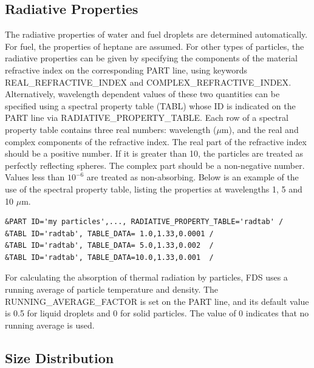 \documentclass[11pt]{book}
\begin{document}
\subsection{Radiative Properties}
\label{radiative_part_props}

The radiative properties of water and fuel droplets are determined automatically. For fuel, the properties of heptane are assumed. For other types of particles, the radiative properties can be given by specifying the components of the material refractive index on the corresponding {\ct PART} line, using keywords {\ct REAL\_REFRACTIVE\_INDEX} and {\ct COMPLEX\_REFRACTIVE\_INDEX}. Alternatively, wavelength dependent values of these two quantities can be specified using a spectral property table ({\ct TABL}) whose {\ct ID} is indicated on the {\ct PART} line via {\ct RADIATIVE\_PROPERTY\_TABLE}. Each row of a spectral property table contains three real numbers: wavelength ($\mu$m), and the real and complex components of the refractive index. The real part of the refractive index should be a positive number. If it is greater than 10, the particles are treated as perfectly reflecting spheres. The complex part should be a non-negative number. Values less than $10^{-6}$ are treated as non-absorbing. Below is an example of the use of the spectral property table, listing the properties at wavelengths 1, 5 and 10 $\mu$m.
\begin{lstlisting}
&PART ID='my particles',..., RADIATIVE_PROPERTY_TABLE='radtab' /
&TABL ID='radtab', TABLE_DATA= 1.0,1.33,0.0001 /
&TABL ID='radtab', TABLE_DATA= 5.0,1.33,0.002  /
&TABL ID='radtab', TABLE_DATA=10.0,1.33,0.001  /
\end{lstlisting}
For calculating the absorption of thermal radiation by particles, FDS uses a running average of particle temperature and density. The {\ct RUNNING\_AVERAGE\_FACTOR} is set on the {\ct PART} line, and its default value is 0.5 for liquid droplets and 0 for solid particles. The value of 0 indicates that no running average is used.


\subsection{Size Distribution}
\label{info:particle_size}
\label{droplet_distributions_2}
\end{document}
